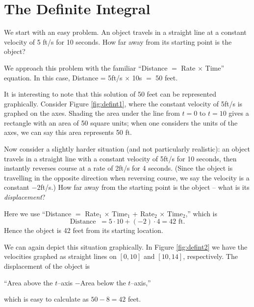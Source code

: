 \section{The Definite Integral}\label{sec:def_int}

We start with an easy problem. An object travels in a straight line at a constant velocity of 5 ft/s for 10 seconds. How far away from its starting point is the object?

We approach this problem with the familiar ``Distance $=$ Rate $\times$ Time'' equation. In this case, Distance = 5ft/s $\times$ 10s $=$ 50 feet.

It is interesting to note that this solution of 50 feet can be represented graphically. Consider Figure \ref{fig:defint1}, where the constant velocity of 5ft/s is graphed on the axes. Shading the area under the line from $t=0$ to $t=10$ gives a rectangle with an area of 50 square units; when one considers the units of the axes, we can say this area represents 50 ft.


Now consider a slightly harder situation (and not particularly realistic): an object travels in a straight line with a constant velocity of 5ft/s for 10 seconds, then instantly reverses course at a rate of 2ft/s for 4 seconds. (Since the object is travelling in the opposite direction when reversing course, we say the velocity is a constant $-2$ft/s.) How far away from the starting point is the object -- what is its \textit{displacement}?

Here we use ``Distance $=$ Rate$_1$ $\times$ Time$_1$ + Rate$_2$ $\times$ Time$_2$,'' which is 
	\[
	\text{Distance } \ = 5\cdot10 + (-2)\cdot 4 = 42\text{ ft.}
	\] 
Hence the object is 42 feet from its starting location.

We can again depict this situation graphically. In Figure \ref{fig:defint2} we have the velocities graphed as straight lines on $[0,10]$ and $[10,14]$, respectively. The displacement of the object is 
		\begin{center}``Area above the $t$--axis \quad $-$\quad Area below the $t$--axis,''
		\end{center}
which is easy to calculate as $50-8=42$ feet.


